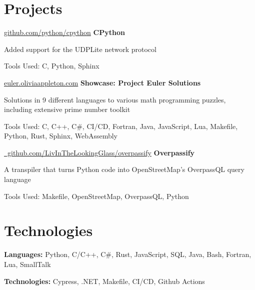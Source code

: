 	\section{Projects}

	\begin{twocolentry}
		{ \href{https://github.com/python/cpython}{github.com/python/cpython} } \textbf{CPython}
	\end{twocolentry}

	\begin{onecolentry}
		\begin{highlights}
			\item Added support for the UDPLite network protocol \item Tools Used: C, Python,
			Sphinx
		\end{highlights}
	\end{onecolentry}

	\vspace{0.2 cm}

	\begin{twocolentry}
		{ \href{https://euler.oliviaappleton.com}{euler.oliviaappleton.com} } \textbf{Showcase:
		Project Euler Solutions}
	\end{twocolentry}

	\begin{onecolentry}
		\begin{highlights}
			\item Solutions in 9 different languages to various math programming puzzles, including extensive prime number toolkit
			\item Tools Used: C, C+\!+, C\#, CI/CD, Fortran, Java, JavaScript, Lua,
			Makefile, Python, Rust, Sphinx, WebAssembly
		\end{highlights}
	\end{onecolentry}

	\vspace{0.2 cm}

	\begin{twocolentry}
		{ \href{https://github.com/LivInTheLookingGlass/overpassify}{ \mbox{\hspace{-100pt} github.com/LivInTheLookingGlass/overpassify}} } \textbf{Overpassify}
	\end{twocolentry}

	\begin{onecolentry}
		\begin{highlights}
			\item A transpiler that turns Python code into OpenStreetMap's OverpassQL query language
			\item Tools Used: Makefile, OpenStreetMap, OverpassQL, Python
		\end{highlights}
	\end{onecolentry}

	\section{Technologies}

	\begin{onecolentry}
		\textbf{Languages:} Python, C/C+\!+, C\#, Rust, JavaScript, SQL, Java, Bash,
		Fortran, Lua, SmallTalk
	\end{onecolentry}

	\begin{onecolentry}
		\textbf{Technologies:} Cypress, .NET, Makefile, CI/CD, Github Actions
	\end{onecolentry}


